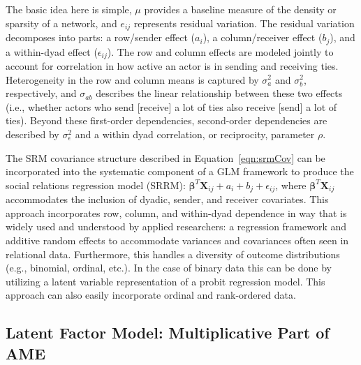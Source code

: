 \documentclass[12pt,pdflatex]{elsarticle}
\begin{document}
The basic idea here is   simple, $\mu$ provides a baseline measure of the density or sparsity of a network, and $e_{ij}$ represents residual variation. The residual variation decomposes into parts: a row/sender effect ($a_{i}$), a column/receiver effect ($b_{j}$), and a within-dyad effect ($\epsilon_{ij}$). The row and column effects are modeled jointly to account for correlation in how active an actor is in sending and receiving ties. Heterogeneity in the row and column means is captured by $\sigma_{a}^{2}$ and $\sigma_{b}^{2}$, respectively, and $\sigma_{ab}$ describes the linear relationship between these two effects (i.e., whether actors who send [receive] a lot of ties also receive [send] a lot of ties). Beyond these first-order dependencies, second-order dependencies are described by $\sigma_{\epsilon}^{2}$ and a within dyad correlation, or reciprocity, parameter $\rho$. 

The SRM covariance structure described in Equation~\ref{eqn:srmCov} can be incorporated into the systematic component of a GLM framework to produce the social relations regression model (SRRM): $\bm\beta^{T} \mathbf{X}_{ij} + a_{i} + b_{j} + \epsilon_{ij}$, where $ \bm\beta^{T} \mathbf{X}_{ij}$ accommodates the inclusion of dyadic, sender, and receiver covariates. This approach  \citep{hoff:2005}  incorporates row, column, and within-dyad dependence in way that is widely used and understood by applied researchers: a regression framework and additive random effects to accommodate variances and covariances often seen in relational data. Furthermore, this  handles a diversity of outcome distributions (e.g., binomial, ordinal, etc.). In the case of binary data this can be done by utilizing a latent variable representation of a probit regression model. 
This approach can also easily incorporate ordinal and rank-ordered data.

\subsection{Latent Factor Model: Multiplicative Part of AME}
\end{document}
